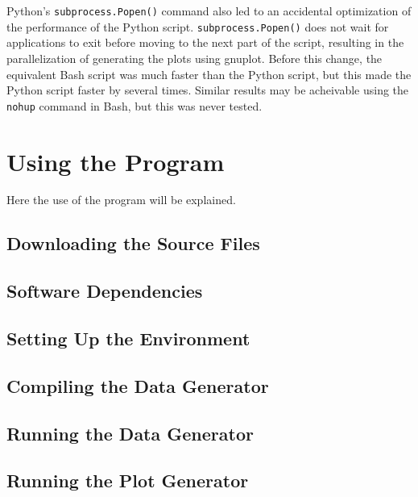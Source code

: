 \documentclass[11pt]{article}
\begin{document}
Python's \texttt{subprocess.Popen()} command also led to an accidental optimization of the performance of the Python script. \texttt{subprocess.Popen()} does not wait for applications to exit before moving to the next part of the script, resulting in the parallelization of generating the plots using gnuplot. Before this change, the equivalent Bash script was much faster than the Python script, but this made the Python script faster by several times. Similar results may be acheivable using the \texttt{nohup} command in Bash, but this was never tested.



\section{Using the Program}

Here the use of the program will be explained.

\subsection{Downloading the Source Files}



\subsection{Software Dependencies}



\subsection{Setting Up the Environment}



\subsection{Compiling the Data Generator}



\subsection{Running the Data Generator}



\subsection{Running the Plot Generator}
\end{document}
